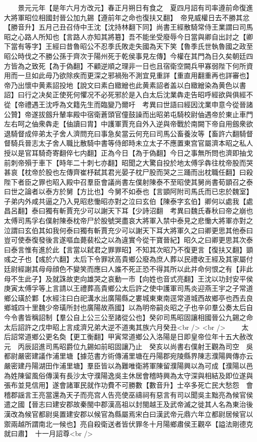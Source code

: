 　　景元元年【是年六月方改元】春正月朔日有食之　夏四月詔有司率遵前命復進大將軍昭位相國封晉公加九錫【遵前年之命也復扶又翻】　帝見威權日去不勝其忿【勝音升】五月己丑召侍中王沈【沈持林翻下同】尚書王經散騎常侍王業謂曰司馬昭之心路人所知也【言路人亦知其將簒】吾不能坐受廢辱今日當與卿自出討之【卿下當有等字】王經曰昔魯昭公不忍季氏敗走失國為天下笑【魯季氏世執魯國之政至昭公時伐之不勝公孫于齊次于陽州死于乾侯事見左傳】今權在其門為日久矣朝廷四方皆為之致死【為于偽翻】不顧逆順之理非一日也且宿衛空闕兵甲寡弱陛下何所資用而一旦如此毋乃欲除疾而更深之邪禍殆不測宜見重詳【重直用翻重再也詳審也】帝乃出懷中黄素詔投地【說文曰素白緻繒也此黄素詔者盖以白緻繒染為黄色以書詔】曰行之决矣正使死何懼况不必死邪於是入白太后沈業犇走告昭呼經欲與俱經不從【帝禮遇王沈呼為文籍先生而臨變乃爾吁　考異曰世語曰經因沈業申意今從晉諸公贊】帝遂拔劔升輦率殿中宿衛蒼頭官僮鼓譟而出昭弟屯騎校尉伷遇帝於東止車門左右呵之伷衆犇走【伷讀曰胄】中護軍賈充自外入逆與帝戰於南闕下帝自用劔衆欲退騎督成倅弟太子舍人濟問充曰事急矣當云何充曰司馬公畜養汝等【畜許六翻騎督督騎兵晉志太子舍人職比散騎中書等侍郎時未立太子不應置東宫官屬濟本昭之私人授以是官耳騎奇寄翻倅七内翻】正為今日【為于偽翻】今日之事無所問也濟即抽戈前刺帝殞于車下【時年二十刺七亦翻】昭聞之大驚自投於地太傅孚犇往枕帝股而哭甚哀【枕帝於股也左傳齊崔杼弑其君光晏子枕尸股而哭之三踊而出枕職任翻】曰殺陛下者臣之罪也昭入殿中召羣臣會議尚書左僕射陳泰不至昭使其舅尚書荀顗召之泰曰世之論者以泰方於舅【方比也】今舅不如泰也【言顗阿附司馬氏而已忠於魏室】子弟内外咸共逼之乃入見昭悲慟昭亦對之泣曰玄伯【陳泰字玄伯】卿何以處我【處昌呂翻】泰曰獨有斬賈充少可以謝天下耳【少詩沼翻　考異曰魏氏春秋曰帝之崩也太傅司馬孚右僕射陳泰枕帝尸於股號哭盡哀大將軍入禁中泰見之悲慟大將軍亦對之泣謂曰玄伯其如我何泰曰獨有斬賈充少可以謝天下耳大將軍久之曰卿更思其他泰曰豈可使泰復發後言遂嘔血薨裴松之以為違實今從干寶晉紀】昭久之曰卿更思其次泰曰泰言惟有進於此【言當以弑君之罪罪昭】不知其次昭乃不復更言【復扶又翻】顗彧之子也【彧於六翻】太后下令罪狀高貴鄉公廢為庶人葬以民禮收王經及其家屬付廷尉經謝其母母顔色不變笑而應曰人誰不死正恐不得其所以此并命何恨之有【非此母不生此子】及就誅故吏向雄哭之哀動一市【向姓也音式亮翻】王沈以功封安平侯庚寅太傅孚等上言請以王禮葬高貴鄉公太后許之使中護軍司馬炎迎燕王宇之子常道鄉公璜於鄴【水經注曰白祀溝水出廣陽縣之婁城東東南逕常道城西故鄉亭也西去良鄉城四十里魏少帝璜所封也廣陽故燕國】以為明帝嗣炎昭之子也辛卯羣公奏太后自今令書皆稱詔制【羣公自上公三公至諸從公也】癸卯司馬昭固讓相國晉公九錫之命太后詔許之戊申昭上言成濟兄弟大逆不道夷其族六月癸丑<br />
<br />
　　太后詔常道鄉公更名奐【更工衡翻】甲寅常道鄉公入洛陽是日即皇帝位年十五大赦改元　丙辰詔進司馬昭爵位九錫如前昭固讓乃止　癸亥以尚書右僕射王觀為司空　吳都尉嚴密建議作浦里塘【據范書方術傳浦里塘在丹陽郡宛陵縣界陳志濮陽興傳亦云嚴密建丹陽湖田作浦里塘】羣臣皆以為難唯衛將軍陳留濮陽興以為可成【濮陽以邑為姓陳留風俗傳漢有長沙太守濮陽逸吳主休居會稽時興為太守深與相結及即位遂與張布並見信用】遂會諸軍民就作功費不可勝數【數音升】士卒多死亡民大愁怨　會稽郡謡言王亮當還為天子而亮宫人告亮使巫禱祠有惡言有司以聞吳主黜亮為候官侯遣之國【晉志曰建安郡故秦閩中郡漢高祖以封閩越王及武帝滅之徙其人名為東治後漢改為候官都尉吳置建安郡以候官為縣屬焉宋白曰漢武帝元鼎六年立都尉居候官以禦兩越所謂南北一候也】亮自殺衛送者皆伏罪冬十月陽鄉肅侯王觀卒【謚法剛德克就曰肅】　十一月詔尊<br />
